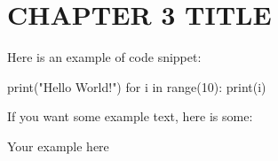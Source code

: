\chapter{CHAPTER 3 TITLE}

Here is an example of code snippet:
\begin{code}
	print("Hello World!")
	for i in range(10):
		print(i)
\end{code}

If you want some example text, here is some:
\begin{example}
	Your example here
\end{example}